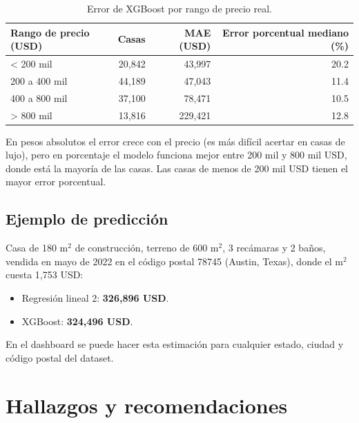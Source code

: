 \documentclass[12pt,letterpaper]{article}
\begin{document}
\begin{table}[H]
\centering
\caption{Error de XGBoost por rango de precio real.}
\small
\begin{tabular}{lrrr}
\toprule
Rango de precio (USD) & Casas & MAE (USD) & Error porcentual mediano (\%) \\
\midrule
< 200 mil & 20,842 & 43,997 & 20.2 \\
200 a 400 mil & 44,189 & 47,043 & 11.4 \\
400 a 800 mil & 37,100 & 78,471 & 10.5 \\
> 800 mil & 13,816 & 229,421 & 12.8 \\
\bottomrule
\end{tabular}
\end{table}

En pesos absolutos el error crece con el precio (es más difícil acertar en casas de lujo), pero en porcentaje el modelo funciona mejor entre 200 mil y 800 mil USD, donde está la mayoría de las casas. Las casas de menos de 200 mil USD tienen el mayor error porcentual.

\subsection{Ejemplo de predicción}

Casa de 180 m$^2$ de construcción, terreno de 600 m$^2$, 3 recámaras y 2 baños, vendida en mayo de 2022 en el código postal 78745 (Austin, Texas), donde el m$^2$ cuesta 1,753 USD:
\begin{itemize}[nosep]
  \item Regresión lineal 2: \textbf{326,896 USD}.
  \item XGBoost: \textbf{324,496 USD}.
\end{itemize}
En el dashboard se puede hacer esta estimación para cualquier estado, ciudad y código postal del dataset.

\section{Hallazgos y recomendaciones}
\end{document}
